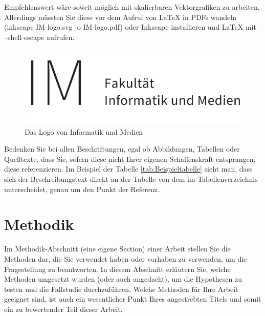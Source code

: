 Empfehlenswert wäre soweit möglich mit skalierbaren Vektorgrafiken zu arbeiten. Allerdings müssten Sie diese vor dem Aufruf von LaTeX in PDFs wandeln (inkscape IM-logo.svg -o IM-logo.pdf) oder Inkscape installieren und LaTeX mit --shell-escape aufrufen.

\begin{figure}[!t]
    \centering
    \includegraphics[scale=0.6]{Bilder/logos/IM-logo}
    \caption{Das Logo von Informatik und Medien }
\end{figure}

Bedenken Sie bei allen Beschriftungen, egal ob Abbildungen, Tabellen oder Quelltexte, dass Sie, sofern diese nicht Ihrer eigenen Schaffenskraft entsprangen,
diese referenzieren. Im Beispiel der Tabelle \ref{tab:Beispieltabelle} sieht man, dass sich der Beschreibungstext direkt an der Tabelle von dem im Tabellenverzeichnis unterscheidet,
genau um den Punkt der Referenz.

\section{Methodik}

Im Methodik-Abschnitt (eine eigene Section) einer Arbeit stellen Sie die Methoden dar, die Sie verwendet haben oder vorhaben zu verwenden, um die Fragestellung zu beantworten. 
In diesem Abschnitt erläutern Sie, welche Methoden umgesetzt wurden (oder auch angedacht), um die Hypothesen zu testen und die Fallstudie durchzuführen. 
Welche Methoden für Ihre Arbeit geeignet sind, ist auch ein wesentlicher Punkt Ihres angestrebten Titels und somit ein zu bewertender Teil dieser Arbeit. 

